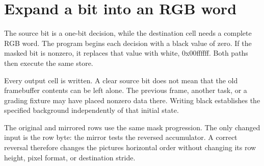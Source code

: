 \section{Expand a bit into an RGB
  word}\label{003-eight-byte-sprite-p07-expand-a-bit-into-an-rgb-word}

The source bit is a one-bit decision, while the destination cell needs a
complete RGB word. The program begins each decision with a black value
of zero. If the masked bit is nonzero, it replaces that value with
white, 0x00ffffff. Both paths then execute the same store.

Every output cell is written. A clear source bit does not mean that the
old framebuffer contents can be left alone. The previous frame, another
task, or a grading fixture may have placed nonzero data there. Writing
black establishes the specified background independently of that initial
state.

The original and mirrored rows use the same mask progression. The only
changed input is the row byte: the mirror tests the reversed
accumulator. A correct reversal therefore changes the
picture\textquotesingle s horizontal order without changing its row
height, pixel format, or destination stride.
